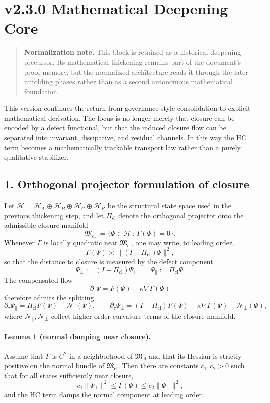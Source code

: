 \section*{v2.3.0 Mathematical Deepening Core}
\begin{quote}
\textbf{Normalization note.} This block is retained as a historical deepening precursor. Its mathematical thickening remains part of the document's proof memory, but the normalized architecture reads it through the later unfolding phases rather than as a second autonomous mathematical foundation.
\end{quote}

This version continues the return from governance-style consolidation to
explicit mathematical derivation. The focus is no longer merely that closure can
be encoded by a defect functional, but that the induced closure flow can be
separated into invariant, dissipative, and residual channels. In this way the
HC term becomes a mathematically trackable transport law rather than a purely
qualitative stabilizer.

\subsection*{1. Orthogonal projector formulation of closure}
Let $\mathcal H=\mathcal H_A\oplus\mathcal H_B\oplus\mathcal H_C\oplus\mathcal H_R$
be the structural state space used in the previous thickening step, and let
$\Pi_{\mathrm{cl}}$ denote the orthogonal projector onto the admissible closure
manifold
\[
\mathfrak M_{\mathrm{cl}}:=\{\Psi\in\mathcal H\,:\,\Gamma(\Psi)=0\}.
\]
Whenever $\Gamma$ is locally quadratic near $\mathfrak M_{\mathrm{cl}}$, one may
write, to leading order,
\[
\Gamma(\Psi)\asymp \| (I-\Pi_{\mathrm{cl}})\Psi\|^2,
\]
so that the distance to closure is measured by the defect component
\[
\Psi_{\perp}:=(I-\Pi_{\mathrm{cl}})\Psi,
\qquad
\Psi_{\parallel}:=\Pi_{\mathrm{cl}}\Psi.
\]
The compensated flow
\[
\partial_\tau \Psi = F(\Psi)-\kappa\nabla\Gamma(\Psi)
\]
therefore admits the splitting
\[
\partial_\tau \Psi_{\parallel}=\Pi_{\mathrm{cl}}F(\Psi)+\mathcal N_{\parallel}(\Psi),
\qquad
\partial_\tau \Psi_{\perp}=(I-\Pi_{\mathrm{cl}})F(\Psi)-\kappa\nabla\Gamma(\Psi)+\mathcal N_{\perp}(\Psi),
\]
where $\mathcal N_{\parallel},\mathcal N_{\perp}$ collect higher-order curvature
terms of the closure manifold.

\paragraph{Lemma 1 (normal damping near closure).}
Assume that $\Gamma$ is $C^2$ in a neighborhood of $\mathfrak M_{\mathrm{cl}}$ and that
its Hessian is strictly positive on the normal bundle of
$\mathfrak M_{\mathrm{cl}}$. Then there are constants $c_1,c_2>0$ such that for all
states sufficiently near closure,
\[
c_1\|\Psi_{\perp}\|^2\le \Gamma(\Psi)\le c_2\|\Psi_{\perp}\|^2,
\]
and the HC term damps the normal component at leading order.

